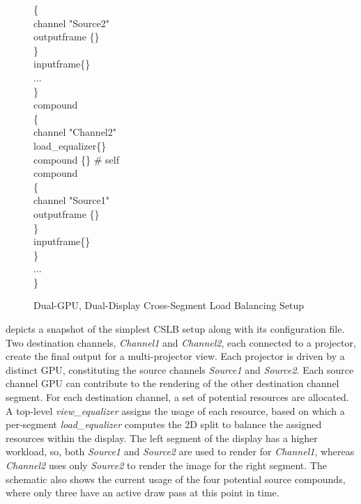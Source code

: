 \begin{figure}[h!t]
{\begin{minipage}[b]{0.46\textwidth}
{\quad \quad \{ \\
\quad \quad \quad channel "Source2" \\
\quad \quad \quad outputframe \{\} \\
\quad \quad \} \\
\quad \quad inputframe\{\} \\
\quad \quad ... \\
\quad \} \\
\quad compound \\
\quad \{ \\
\quad \quad channel "Channel2" \\
\quad \quad load\_equalizer\{\} \\
\quad \quad compound \{\} \# self \\
\quad \quad compound \\
\quad \quad \{  \\
\quad \quad \quad channel "Source1"  \\
\quad \quad \quad outputframe \{\}  \\
\quad \quad \} \\
\quad \quad inputframe\{\} \\
\quad \} \\
\quad ... \\
\} \\
	\label{fViewEqualizerConfig}}
	\end{minipage}
   }
\caption{Dual-GPU, Dual-Display Cross-Segment Load Balancing Setup}
\label{fViewEqualizer}
\end{figure}

 depicts a snapshot of the simplest CSLB setup along with
its configuration file. Two destination channels, {\em Channel1} and {\em
Channel2}, each connected to a projector, create the final output for a
multi-projector view. Each projector is driven by a distinct GPU, constituting
the source channels {\em Source1} and {\em Source2}. Each source channel GPU
can contribute to the rendering of the other destination channel segment. For
each destination channel, a set of potential resources are allocated. A
top-level {\em view\_equalizer} assigns the usage of each resource, based on
which a per-segment {\em load\_equalizer} computes the 2D split to balance the
assigned resources within the display. The left segment of the display has a
higher workload, so, both {\em Source1} and {\em Source2} are used to render
for {\em Channel1}, whereas {\em Channel2} uses only {\em Source2} to render
the image for the right segment. The schematic also shows the current usage of
the four potential source compounds, where only three have an active draw pass
at this point in time.

